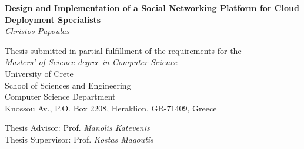 \begin{titlepage}
\begin{center}

\LARGE \textbf{Design and Implementation of a Social Networking Platform for Cloud Deployment Specialists}\\[0.5cm]
\LARGE \textit{Christos Papoulas}\\[0.5cm]

\vfill

\normalsize{
Thesis submitted in partial fulfillment of the requirements for the\\[0.30cm]

\textit{Masters' of Science degree in Computer Science}}\\[0.30cm]

University of Crete\\
School of Sciences and Engineering\\
Computer Science Department\\
Knossou Av., P.O. Box 2208, Heraklion, GR-71409, Greece\\[0.5cm]

\vfill

\Large{Thesis Advisor: Prof. \emph{Manolis Katevenis}}\\[0.5cm]
\Large{Thesis Supervisor: Prof. \emph{Kostas Magoutis}}\\[0.5cm]
\vfill

\end{center}

\end{titlepage}
